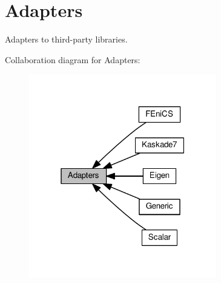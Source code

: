 \hypertarget{group__AdapterGroup}{}\section{Adapters}
\label{group__AdapterGroup}


Adapters to third-\/party libraries.  


Collaboration diagram for Adapters\+:\nopagebreak
\begin{figure}[H]
\begin{center}
\leavevmode
\includegraphics[width=232pt]{group__AdapterGroup}
\end{center}
\end{figure}
